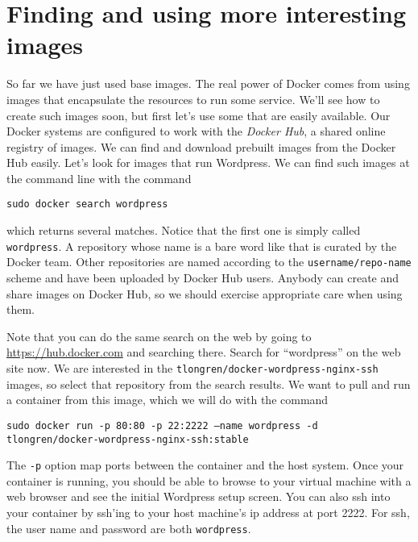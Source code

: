 \documentclass{article}
\begin{document}
\section{Finding and using more interesting images}
So far we have just used base images.  The real power of Docker comes from using images that encapsulate the resources to run some service.  We'll see how to create such images soon, but first let's use some that are easily available.  Our Docker systems are configured to work with the \emph{Docker Hub}, a shared online registry of images.  We can find and download prebuilt images from the Docker Hub easily.  Let's look for images that run Wordpress.  We can find such images at the command line with the command

\texttt{sudo docker search wordpress}

which returns several matches.  Notice that the first one is simply called \texttt{wordpress}.  A repository whose name is a bare word like that is curated by the Docker team.  Other repositories are named according to the \texttt{username/repo-name} scheme and have been uploaded by Docker Hub users. Anybody can create and share images on Docker Hub, so we should exercise appropriate care when using them.

Note that you can do the same search on the web by going to \url{https://hub.docker.com} and searching there.  Search for ``wordpress'' on the web site now.  We are interested in the \texttt{tlongren/docker-wordpress-nginx-ssh} images, so select that repository from the search results.  We want to pull and run a container from this image, which we will do with the command

\texttt{sudo docker run -p 80:80 -p 22:2222 --name wordpress -d tlongren/docker-wordpress-nginx-ssh:stable}

The \texttt{-p} option map ports between the container and the host system. Once your container is running, you should be able to browse to your virtual machine with a web browser and see the initial Wordpress setup screen.  You can also ssh into your container by ssh'ing to your host machine's ip address at port 2222.  For ssh, the user name and password are both \texttt{wordpress}.
\end{document}
